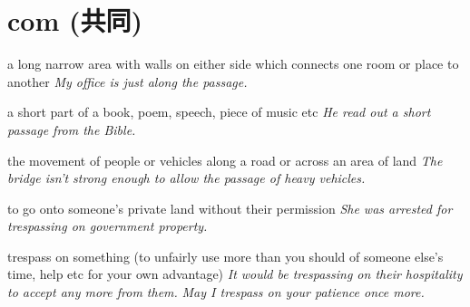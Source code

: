 \chapter{com (共同)}

\begin{vocabulary}[compass]
\end{vocabulary}

\begin{vocabulary}[passage]
    a long narrow area with walls on either side which connects one room or place to another
    \textit{My office is just along the passage.}

    a short part of a book, poem, speech, piece of music etc
    \textit{He read out a short passage from the Bible.}

    the movement of people or vehicles along a road or across an area of land
    \textit{The bridge isn’t strong enough to allow the passage of heavy vehicles.}
\end{vocabulary}

\begin{vocabulary}[passenger]
\end{vocabulary}

\begin{vocabulary}[trespass]
    to go onto someone’s private land without their permission
    \textit{She was arrested for trespassing on government property.}

    trespass on something (to unfairly use more than you should of someone else’s time, help etc for your own advantage)
    \textit{It would be trespassing on their hospitality to accept any more from them.}
    \textit{May I trespass on your patience once more.}
\end{vocabulary}
